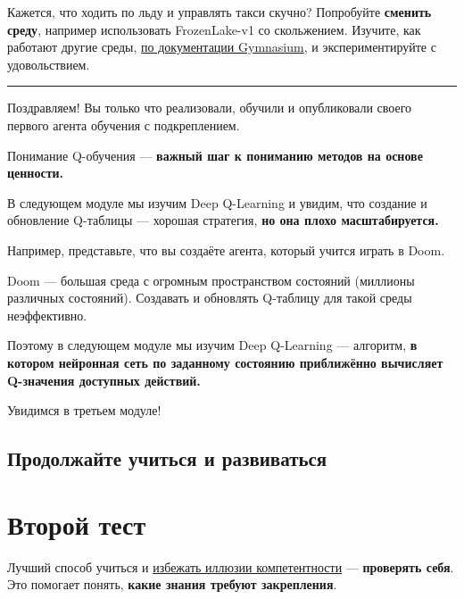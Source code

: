 \documentclass[11pt,a4paper]{article}
\begin{document}
Кажется, что ходить по льду и управлять такси скучно? Попробуйте \textbf{сменить среду}, например использовать FrozenLake-v1 со скольжением. Изучите, как работают другие среды, \href{https://gymnasium.farama.org/}{по документации Gymnasium}, и экспериментируйте с удовольствием.

\begin{center}\rule{0.5\linewidth}{0.5pt}\end{center}

Поздравляем! Вы только что реализовали, обучили и опубликовали своего первого агента обучения с подкреплением.

Понимание Q-обучения --- \textbf{важный шаг к пониманию методов на основе ценности.}

В следующем модуле мы изучим Deep Q-Learning и увидим, что создание и обновление Q-таблицы --- хорошая стратегия, \textbf{но она плохо масштабируется.}

Например, представьте, что вы создаёте агента, который учится играть в Doom.


Doom --- большая среда с огромным пространством состояний (миллионы различных состояний). Создавать и обновлять Q-таблицу для такой среды неэффективно.

Поэтому в следующем модуле мы изучим Deep Q-Learning --- алгоритм, \textbf{в котором нейронная сеть по заданному состоянию приближённо вычисляет Q-значения доступных действий.}


Увидимся в третьем модуле!

\subsection{Продолжайте учиться и развиваться}\label{keep-learning-stay-awesome}

\section{Второй тест}\label{second-quiz}

Лучший способ учиться и \href{https://www.coursera.org/lecture/learning-how-to-learn/illusions-of-competence-BuFzf}{избежать иллюзии компетентности} --- \textbf{проверять себя}. Это помогает понять, \textbf{какие знания требуют закрепления}.
\end{document}
